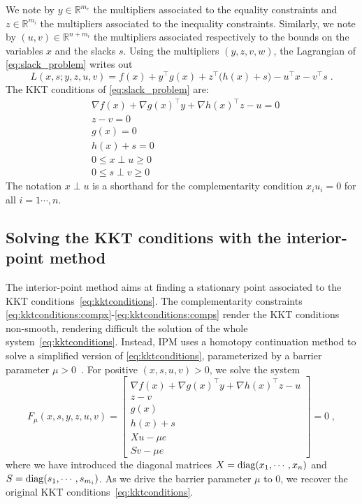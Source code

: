 We note by $y \in \mathbb{R}^{m_e}$ the multipliers associated
to the equality constraints and $z \in \mathbb{R}^{m_i}$ the multipliers
associated to the inequality constraints. Similarly, we note
by $(u, v) \in \mathbb{R}^{n + m_i}$ the multipliers associated
respectively to the bounds on the variables $x$ and the slacks $s$.
Using the multipliers $(y, z, v, w)$, the Lagrangian of \eqref{eq:slack_problem} writes out
\begin{equation}
  \label{eq:lagrangian}
  L(x, s; y, z, u, v) = f(x) + y^\top g(x) + z^\top \big(h(x) +s\big)
  - u^\top x - v^\top s \; .
\end{equation}
The KKT conditions of \eqref{eq:slack_problem} are:
\begin{subequations}
  \label{eq:kktconditions}
    \begin{align}
      & \nabla f(x) + \nabla g(x)^\top y + \nabla h(x)^\top z - u = 0 \\
      & z - v = 0 \\
      & g(x) = 0 \\
      & h(x) + s = 0 \\
      \label{eq:kktconditions:compx}
      & 0 \leq x \perp u \geq 0 \\
      \label{eq:kktconditions:comps}
      & 0 \leq s \perp v \geq 0
    \end{align}
\end{subequations}
The notation $x \perp u$ is a shorthand for the complementarity
condition $x_i u_i = 0$ for all $i=1\cdots, n$.

\subsection{Solving the KKT conditions with the interior-point method}
\label{sec:ipm:kkt}
The interior-point method aims at finding a stationary point
associated to the KKT conditions~\eqref{eq:kktconditions}.
The complementarity constraints \eqref{eq:kktconditions:compx}-\eqref{eq:kktconditions:comps}
render the KKT conditions non-smooth, rendering difficult the solution of
the whole system~\eqref{eq:kktconditions}.
Instead, IPM uses a homotopy continuation method to solve a simplified
version of \eqref{eq:kktconditions}, parameterized by a barrier
parameter $\mu > 0$~\cite[Chapter 19]{nocedal_numerical_2006}.
For positive $(x, s, u, v) > 0$, we solve the system
\begin{equation}
  \label{eq:kkt_ipm}
  F_\mu(x, s, y, z, u, v) =
  \begin{bmatrix}
       \nabla f(x) + \nabla g(x)^\top y + \nabla h(x)^\top z - u  \\
       z - v  \\
       g(x)  \\
       h(x) + s  \\
       X u - \mu e  \\
       S v - \mu e
  \end{bmatrix}
  = 0 \; ,
\end{equation}
where we have introduced the diagonal matrices $X = \operatorname{diag}(x_1, \cdots, x_n)$
and $S = \operatorname{diag}(s_1, \cdots, s_{m_i})$.
As we drive the barrier parameter $\mu$ to $0$, we recover the original
KKT conditions~\eqref{eq:kktconditions}.

